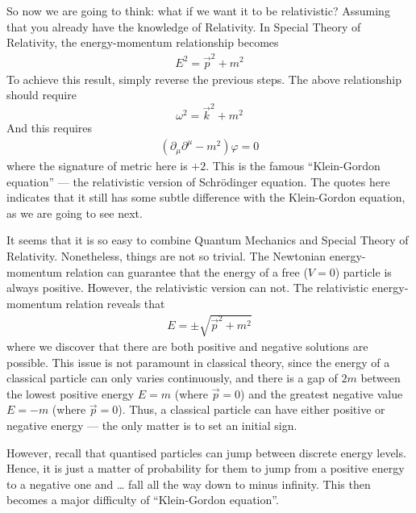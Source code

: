 \documentclass[letterpaper,10pt,english]{sphinxmanual}
\begin{document}
So now we are going to think: what if we want it to be relativistic? Assuming that you already have the knowledge of Relativity. In Special Theory of Relativity, the energy-momentum relationship becomes
\begin{equation*}
\begin{split}E^2 = \vec p^2 + m^2\end{split}
\end{equation*}
To achieve this result, simply reverse the previous steps. The above relationship should require
\begin{equation}
\omega^2 = \vec k^2 + m^2
\end{equation}
And this requires
\begin{equation*}
\begin{split}(\partial_\mu\partial^\mu - m^2)\varphi = 0\end{split}
\end{equation*}
where the signature of metric here is \(+2\). This is the famous “Klein-Gordon equation” — the relativistic version of Schrödinger equation. The quotes here indicates that it still has some subtle difference with the  Klein-Gordon equation, as we are going to see next.

It seems that it is so easy to combine Quantum Mechanics and Special Theory of Relativity. Nonetheless, things are not so trivial. The Newtonian energy-momentum relation can guarantee that the energy of a free (\(V=0\)) particle is always positive. However, the relativistic version can not. The relativistic energy-momentum relation reveals that
\begin{equation*}
\begin{split}E = \pm\sqrt{\vec p^2+m^2}\end{split}
\end{equation*}
where we discover that there are both positive and negative solutions are possible. This issue is not paramount in classical theory, since the energy of a classical particle can only varies continuously, and there is a gap of \(2m\) between the lowest positive energy \(E=m\) (where \(\vec p=0\)) and the greatest negative value \(E=-m\) (where \(\vec p=0\)). Thus, a classical particle can have either positive or negative energy — the only matter is to set an initial sign.

However, recall that quantised particles can jump between discrete energy levels. Hence, it is just a matter of probability for them to jump from a positive energy to a negative one and … fall all the way down to minus infinity. This then becomes a major difficulty of “Klein-Gordon equation”.
\end{document}
